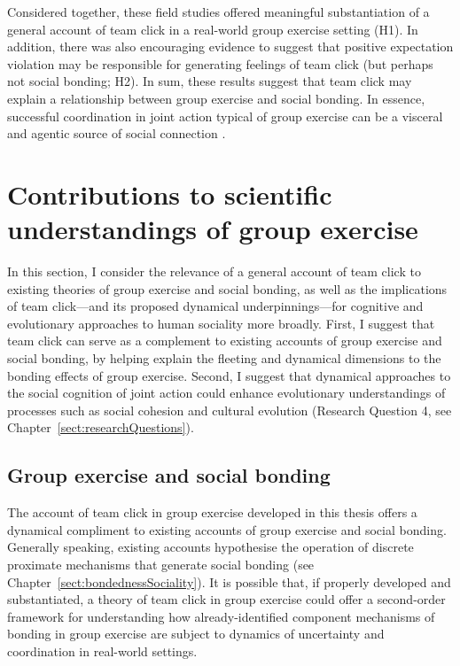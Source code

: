 Considered together, these field studies offered meaningful substantiation of a general account of team click in a real-world group exercise setting (H1).  In addition, there was also encouraging evidence to suggest that positive expectation violation may be responsible for generating feelings of team click (but perhaps not social bonding; H2).  In sum, these results suggest that team click may explain a relationship between group exercise and social bonding.  In essence, successful coordination in joint action typical of group exercise can be a visceral and agentic source of social connection \citep{Marsh2009}.








  \section{Contributions to scientific understandings of group exercise}
In this section, I consider the relevance of a general account of team click to existing theories of group exercise and social bonding, as well as the implications of team click---and its proposed dynamical underpinnings---for cognitive and evolutionary approaches to human sociality more broadly.  First, I suggest that team click can serve as a complement to existing accounts of group exercise and social bonding, by helping explain the fleeting and dynamical dimensions to the bonding effects of group exercise.  Second, I suggest that dynamical approaches to the social cognition of joint action could enhance evolutionary understandings of processes such as social cohesion and cultural evolution (Research Question 4, see Chapter~\ref{sect:researchQuestions}).


  \subsection{Group exercise and social bonding}
The account of team click in group exercise developed in this thesis offers a dynamical compliment to existing accounts of group exercise and social bonding.  Generally speaking, existing accounts hypothesise the operation of discrete proximate mechanisms that generate social bonding (see Chapter~\ref{sect:bondednessSociality}).  It is possible that,  if properly developed and substantiated, a theory of team click in group exercise could offer a second-order framework for understanding how already-identified component mechanisms of bonding in group exercise are subject to dynamics of uncertainty and coordination in real-world settings.

